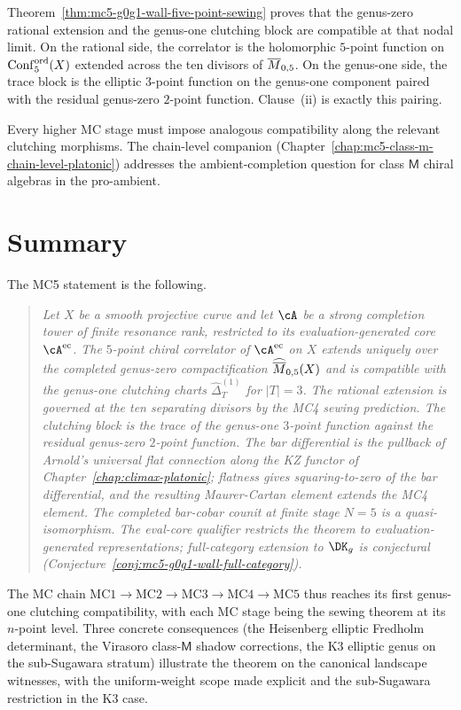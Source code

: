 Theorem~\ref{thm:mc5-g0g1-wall-five-point-sewing} proves that the
genus-zero rational extension and the genus-one clutching block are
compatible at that nodal limit. On the rational side, the correlator is
the holomorphic $5$-point function on $\mathrm{Conf}^{\mathrm{ord}}_{5}(X)$ extended across
the ten divisors of $\overline{M}_{0,5}$. On the genus-one side, the trace block
is the elliptic $3$-point function on the genus-one component paired
with the residual genus-zero $2$-point function. Clause~\textup{(ii)}
is exactly this pairing.

Every higher MC stage must impose analogous compatibility along the
relevant clutching morphisms. The chain-level companion
\textup{(}Chapter~\ref{chap:mc5-class-m-chain-level-platonic}\textup{)}
addresses the ambient-completion question for class $\mathsf{M}$ chiral
algebras in the pro-ambient.

\section{Summary}
\label{sec:mc5-g0g1-summary}

The MC5 statement is the following.

\begin{quote}
\emph{Let $X$ be a smooth projective curve and let $\cA$ be a strong
completion tower of finite resonance rank, restricted to its
evaluation-generated core $\cA^{\evcore}$. The $5$-point chiral
correlator of $\cA^{\evcore}$ on $X$ extends uniquely over the completed
genus-zero compactification $\widehat{\overline{M}}_{0,5}(X)$ and is compatible
with the genus-one clutching charts
$\widehat{\Delta}^{(1)}_{T}$ for $|T|=3$. The rational extension is
governed at the ten separating divisors by the MC4 sewing prediction.
The clutching block is the trace of the genus-one $3$-point function
against the residual genus-zero $2$-point function. The bar differential
is the pullback
of Arnold's universal flat connection along the KZ functor of
Chapter~\ref{chap:climax-platonic}; flatness gives squaring-to-zero of
the bar differential, and the resulting Maurer-Cartan element extends
the MC4 element. The completed bar-cobar counit at finite stage
$N = 5$ is a quasi-isomorphism. The eval-core qualifier restricts the
theorem to evaluation-generated representations; full-category
extension to $\DK_g$ is conjectural
\textup{(}Conjecture~\ref{conj:mc5-g0g1-wall-full-category}\textup{)}.}
\end{quote}

The MC chain $\mathrm{MC1} \to \mathrm{MC2} \to \mathrm{MC3} \to
\mathrm{MC4} \to \mathrm{MC5}$ thus reaches its first genus-one
clutching compatibility, with each MC stage being the sewing theorem at
its $n$-point level. Three concrete consequences (the Heisenberg
elliptic Fredholm determinant, the Virasoro class-$\mathsf{M}$ shadow
corrections, the K3 elliptic genus on the sub-Sugawara stratum)
illustrate the theorem on the canonical landscape witnesses, with the
uniform-weight scope made explicit and the sub-Sugawara restriction in
the K3 case.

